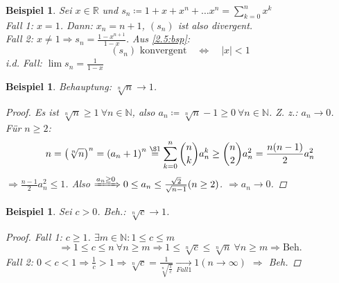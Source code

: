 \documentclass[14pt,titlepage,ngerman,a4paper,headsepline,DIV15,halfparskip*]{scrartcl}
\newcommand{\N}{\mathbb{N}}
\newcommand{\R}{\mathbb{R}}
\theoremstyle{named}
\theoremstyle{dotless}
\newtheorem{beispiel}[namedtheorem]{Beispiel}
\begin{document}
\begin{beispiel} \label{2.6:bsp}
	Sei $x \in \R$ und $s_{n} \coloneqq 1 + x + x^{n} + \dotsc x^{n} = \sum_{k = 0}^{n} x^{k}$ \\
	Fall 1: $x = 1$. Dann: $x_{n} = n + 1$, $(s_{n})$ ist also divergent. \\
	Fall 2: $x \neq 1 \Rightarrow s_{n} = \frac{1 - x^{n+1}}{1 - x}$. Aus \ref{2.5:bsp}:
	$$
		(s_{n}) \text{ konvergent} \quad \iff \quad |x| < 1
	$$
	i.d. Fall: $\lim s_{n} = \frac{1}{1 - x}$
\end{beispiel}


\begin{beispiel} \label{2.7:bsp}
	Behauptung: $\sqrt[n]{n} \rightarrow 1$.
	
	\begin{proof}
		Es ist $\sqrt[n]{n} \geq 1 ~\forall n \in \N$, also $a_{n} \coloneqq \sqrt[n]{n} - 1 \geq 0 ~\forall n \in \N$. Z. z.: $a_{n} \rightarrow 0$. \\
		Für $n \geq 2$:
		$$
			n = \left( \sqrt[n]{n} \right)^{n} = \left( a_{n} + 1 \right)^{n} \overset{\S 1}{=} \sum_{k=0}^{n} \binom{n}{k} a_{n}^{k} \geq \binom{n}{2} a_{n}^{2} = \frac{n(n-1)}{2} a_{n}^{2}
		$$
		$\Rightarrow \frac{n-1}{2}a_{n}^{2} \leq 1$. Also $\xRightarrow[]{a_{n} \geq 0} 0 \leq a_{n} \leq \frac{\sqrt{2}}{\sqrt{n-1}} (n \geq 2)$. $\Rightarrow a_{n} \rightarrow 0$.
	\end{proof}
\end{beispiel}


\begin{beispiel} \label{2.8:bsp}
	Sei $c > 0$. Beh.: $\sqrt[n]{c} \rightarrow 1$.
	
	\begin{proof}
		Fall 1: $c \geq 1$. $\exists m \in \N: 1 \leq c \leq m$
		$$
		 \Rightarrow 1 \leq c \leq n ~\forall n \geq m \Rightarrow 1 \leq \sqrt[n]{c} \leq \sqrt[n]{n} ~\forall n\geq m \Rightarrow \text{Beh.}
		$$
		Fall 2: $0 < c <1 \Rightarrow \frac{1}{c} > 1 \Rightarrow \sqrt[n]{c} = \frac{1}{\sqrt[n]{\frac{1}{c}}} \xrightarrow[Fall 1]{} 1 (n \rightarrow \infty)$ $\Rightarrow$ Beh.
	\end{proof}
\end{beispiel}
\end{document}
